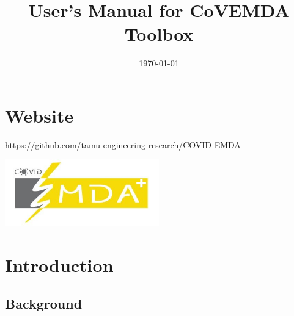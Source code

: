 \documentclass[11pt]{article}
\title{User's Manual for CoVEMDA Toolbox}
\author{}
\date{\today}
\numberwithin{equation}{section}
\numberwithin{table}{section}
\numberwithin{figure}{section}
\begin{document}
\maketitle
\thispagestyle{empty}
\newpage
\tableofcontents
\thispagestyle{empty}


\newpage
\setcounter{page}{1}
\section*{Website}

\url{https://github.com/tamu-engineering-research/COVID-EMDA}

\begin{center}
	\noindent\includegraphics[width=0.5\textwidth]{figures/covid_emda_logo.JPG}
\end{center}



\newpage
\section{Introduction} \label{sec:intro}

\subsection{Background}
\end{document}
